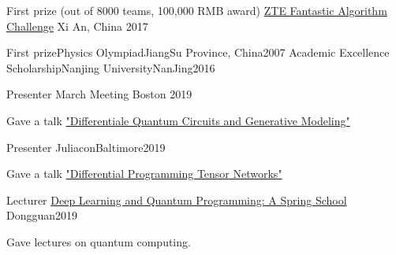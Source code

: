 \documentclass[11pt, a4paper]{awesome-cv}
\begin{document}
%
\begin{cvhonors}
    \cvhonor
    {First prize (out of 8000 teams, 100,000 RMB award)} %
    {\href{http://www.iqiyi.com/w\_19rto3v4h1.html}{ZTE Fantastic Algorithm Challenge}} %
    {Xi An, China} %
    {2017} %

    \cvhonor
    {First prize}{Physics Olympiad}{JiangSu Province, China}{2007}
    \cvhonor
    {Academic Excellence Scholarship}{Nanjing University}{NanJing}{2016}
\end{cvhonors}

%
\begin{cventries}
\cventry
    {Presenter} %
    {March Meeting} %
    {Boston} %
    {2019} %
    {
    \begin{cvitems}
        Gave a talk \href{https://meetings.aps.org/Meeting/MAR19/Session/E27.10}{"Differentiale Quantum Circuits and Generative Modeling"}
    \end{cvitems}
    }
\cventry
    {Presenter}
    {Juliacon}{Baltimore}{2019}
    {
    \begin{cvitems}
        Gave a talk \href{https://www.youtube.com/watch?v=f-CaQMTqjPk}{"Differential Programming Tensor Networks"}
    \end{cvitems}
    }
\cventry
    {Lecturer}
    {\href{https://github.com/QuantumBFS/SSSS}{Deep Learning and Quantum Programming: A Spring School}}
    {Dongguan}{2019}
    {
    \begin{cvitems}
        Gave lectures on quantum computing.
    \end{cvitems}
    }

\end{cventries}
\end{document}
